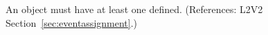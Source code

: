 An \Event object must have at least one \EventAssignment defined.
(References: L2V2 Section~\ref{sec:eventassignment}.)

